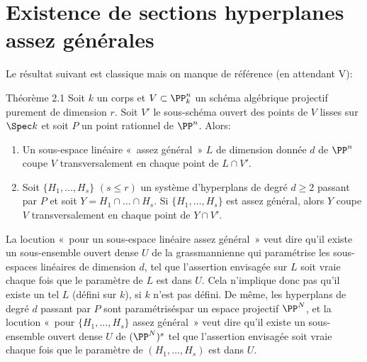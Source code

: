 \documentclass[10pt]{../fichiers-configuration-latex/smfart}
\begin{document}
\section{Existence de sections hyperplanes assez générales}

Le résultat suivant est classique mais on manque de référence (en
attendant \EGA V):

\begin{enonce*}{Théorème 2.1} %
Soit $k$ un corps et $V\subset \PP^n_k$ un schéma algébrique
projectif purement de dimension $r$. Soit $V'$ le sous-schéma ouvert
des points de $V$ lisses sur $\Spec k$ et soit $P$ un point rationnel
de $\PP^n$. Alors:
\begin{enumerate}
\renewcommand{\theenumi}{\roman{enumi}}
\renewcommand{\labelenumi}{(\theenumi)}
\item Un sous-espace linéaire « assez général » $L$ de dimension
  donnée $d$ de $\PP^n$ coupe $V$ transversalement en chaque
  point de $L\cap V'$.

\item Soit $\{H_1,\ldots,H_s\}$ $(s\leq r)$ un système d'hyperplans de %
  degré $d\geq 2$ passant par $P$ et soit $Y=H_1\cap\ldots \cap
  H_s$. Si $\{H_1,\ldots,H_s\}$ est assez général, alors $Y$ coupe $V$
  transversalement en chaque point de $Y\cap V'$.
\end{enumerate}
\end{enonce*}

La locution « pour un sous-espace linéaire assez général » veut
dire qu'il existe un sous-ensemble ouvert dense $U$ de la
grassmannienne qui paramétrise les sous-espaces linéaires de dimension %
$d$, tel que l'assertion envisagée sur $L$ soit vraie chaque fois que
le paramètre de $L$ est dans $U$. Cela n'implique donc pas qu'il
existe un tel $L$ (défini sur $k$), si $k$ n'est pas défini. De même,
les hyperplans de degré $d$ passant par $P$ sont 
paramétrisés\pageoriginale par un espace projectif $\PP^N$, et la %
locution « pour $\{H_1,\ldots,H_s\}$ assez général » veut dire
qu'il existe un sous-ensemble ouvert dense $U$ de $(\PP^N)^s$
tel que l'assertion envisagée soit vraie chaque fois que le paramètre
de $(H_1,\ldots,H_s)$ est dans $U$.
\end{document}
